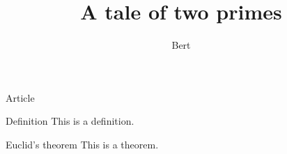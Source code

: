 \documentclass{beamer}
\author{Bert}
\title{A tale of two primes}
\begin{document}
\begin{frame}{Article}
\begin{block}{Definition}
This is a definition.
\end{block}
\pause
\begin{block}{Euclid's theorem}
This is a theorem.
\end{block}
\end{frame}
\end{document}
